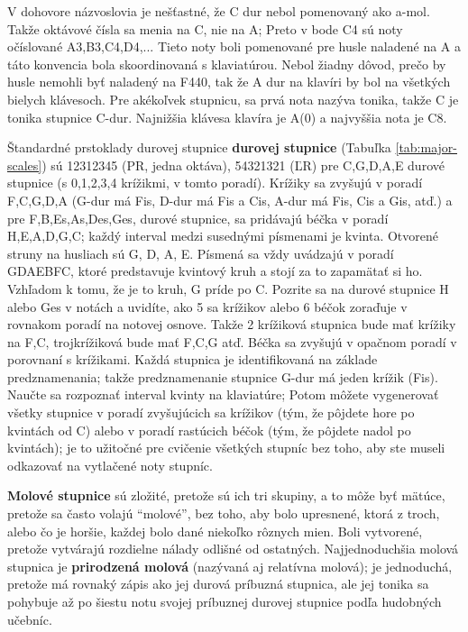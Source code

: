 \documentclass[11pt,a4paper]{book}
\begin{document}
V dohovore názvoslovia je nešťastné, že C dur nebol pomenovaný ako a-mol. Takže oktávové čísla sa menia na C, nie na A; Preto v bode C4 sú noty očíslované A3,B3,C4,D4,... Tieto noty boli pomenované pre husle naladené na A a táto konvencia bola skoordinovaná s klaviatúrou. Nebol žiadny dôvod, prečo by husle nemohli byť naladený na F440, tak že A dur na klavíri by bol na všetkých bielych klávesoch. Pre akékoľvek stupnicu, sa prvá nota nazýva tonika, takže C je tonika stupnice C-dur. Najnižšia klávesa klavíra je A(0) a najvyššia nota je C8.

Štandardné prstoklady durovej stupnice \textbf{durovej stupnice} (Tabuľka \ref{tab:major-scales}) sú 12312345 (PR, jedna oktáva), 54321321 (ĽR) pre C,G,D,A,E durové stupnice (s 0,1,2,3,4 krížikmi, v tomto poradí). Krížiky sa zvyšujú v poradí F,C,G,D,A (G-dur má Fis, D-dur má Fis a Cis, A-dur má Fis, Cis a Gis, atď.) a pre F,B,Es,As,Des,Ges, durové stupnice, sa pridávajú béčka v poradí H,E,A,D,G,C; každý interval medzi susednými písmenami je kvinta. Otvorené struny na husliach sú G, D, A, E. Písmená sa vždy uvádzajú v poradí GDAEBFC, ktoré predstavuje kvintový kruh a stojí za to zapamätať si ho. Vzhľadom k tomu, že je to kruh, G príde po C. Pozrite sa na durové stupnice H alebo Ges v notách a uvidíte, ako 5 sa krížikov alebo 6 béčok zoraďuje v rovnakom poradí na notovej osnove. Takže 2 krížiková stupnica bude mať krížiky na F,C, trojkrížiková bude mať F,C,G atď. Béčka sa zvyšujú v opačnom poradí v porovnaní s krížikami. Každá stupnica je identifikovaná na základe  predznamenania; takže predznamenanie stupnice G-dur má jeden krížik (Fis). Naučte sa rozpoznať interval kvinty na klaviatúre; Potom môžete vygenerovať všetky stupnice v poradí zvyšujúcich sa krížikov (tým, že pôjdete hore po kvintách od C) alebo v poradí rastúcich béčok (tým, že pôjdete nadol po kvintách); je to užitočné pre cvičenie všetkých stupníc bez toho, aby ste museli odkazovať na vytlačené noty stupníc.

\textbf{Molové stupnice} sú zložité, pretože sú ich tri skupiny, a to môže byť mätúce, pretože sa často volajú “molové”, bez toho, aby bolo upresnené, ktorá z troch, alebo čo je horšie, každej bolo dané niekoľko rôznych mien. Boli vytvorené, pretože vytvárajú rozdielne nálady odlišné od ostatných. Najjednoduchšia molová stupnica je \textbf{prirodzená molová} (nazývaná aj relatívna molová); je jednoduchá, pretože má rovnaký zápis ako jej durová príbuzná stupnica, ale jej tonika sa pohybuje až po šiestu notu svojej príbuznej durovej stupnice podľa hudobných učebníc. 
\end{document}
